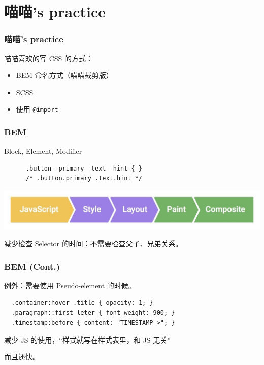 \documentclass[UTF-8]{ctexbeamer}
\begin{document}
\section{喵喵's practice}
\begin{frame}
  \frametitle{喵喵's practice}

  喵喵喜欢的写 CSS 的方式：
  \begin{itemize}
    \item BEM 命名方式（喵喵裁剪版）
    \item SCSS
    \item 使用 \texttt{@import}
  \end{itemize}
\end{frame}
\begin{frame}[fragile]
  \frametitle{BEM}
  \begin{block}{Block, Element, Modifier}
    \begin{verbatim}
      .button--primary__text--hint { }
      /* .button.primary .text.hint */
    \end{verbatim}
  \end{block}

  \vspace{2em}
  \pause
  \includegraphics[width=\textwidth]{assets/frame-full.jpg}

  减少检查 Selector 的时间：不需要检查父子、兄弟关系。
\end{frame}
\begin{frame}[fragile]
  \frametitle{BEM (Cont.)}
  例外：需要使用 Pseudo-element 的时候。

  \begin{verbatim}
  .container:hover .title { opacity: 1; }
  .paragraph::first-leter { font-weight: 900; }
  .timestamp:before { content: "TIMESTAMP >"; }
  \end{verbatim}

  \vspace{2em}
  \pause

  减少 JS 的使用，“样式就写在样式表里，和 JS 无关”

  而且还快。
\end{frame}
\end{document}
